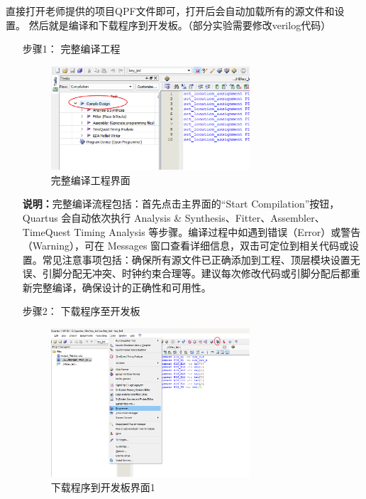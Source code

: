 \documentclass[UTF8]{article}
\theoremstyle{MyLineTheoremStyle} %
\theoremstyle{MyBlockTheoremStyle} %
\theoremstyle{MySubsubsectionStyle} %
\begin{document}
直接打开老师提供的项目QPF文件即可，打开后会自动加载所有的源文件和设置。
然后就是编译和下载程序到开发板。（部分实验需要修改verilog代码）
\begin{enumerate}    
    \item[步骤1：] 完整编译工程
    \begin{figure}[H]
        \centering
        \includegraphics[width=0.7\textwidth]{step8.png}
        \caption{完整编译工程界面}
        \label{fig:step8}
    \end{figure}
    \textbf{说明：}完整编译流程包括：首先点击主界面的“Start Compilation”按钮，Quartus 会自动依次执行 Analysis \& Synthesis、Fitter、Assembler、TimeQuest Timing Analysis 等步骤。编译过程中如遇到错误（Error）或警告（Warning），可在 Messages 窗口查看详细信息，双击可定位到相关代码或设置。常见注意事项包括：确保所有源文件已正确添加到工程、顶层模块设置无误、引脚分配无冲突、时钟约束合理等。建议每次修改代码或引脚分配后都重新完整编译，确保设计的正确性和可用性。
\cleardoublepage

    \item[步骤2：] 下载程序至开发板
    \begin{figure}[H]
        \centering
        \includegraphics[width=0.7\textwidth]{step9.png}
        \caption{下载程序到开发板界面1}
        \label{fig:step9}
    \end{figure}


\end{enumerate}
\end{document}
